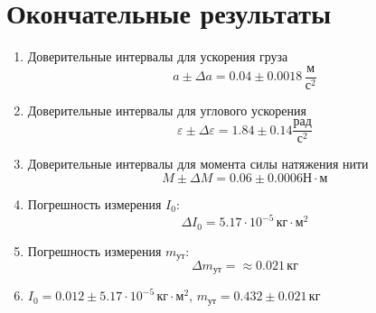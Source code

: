 \section{Окончательные результаты}
\begin{enumerate}
    \item Доверительные интервалы для ускорения груза
        \[ a \pm \Delta a = 0.04 \pm 0.0018 \, \frac{\text{м}}{\text{с}^2} \]
    \item Доверительные интервалы для углового ускорения
        \[
           \varepsilon \pm \Delta \varepsilon = 1.84 \pm 0.14 \frac{\text{рад}}{\text{с}^2} 
        \]
    \item Доверительные интервалы для момента силы натяжения нити
        \[
            M \pm \Delta M = 0.06 \pm 0.0006 \text{Н} \cdot \text{м}
        \]
    \item Погрешность измерения $I_0$:
        \[
            \Delta I_0 = 5.17 \cdot 10^{-5} \, \text{кг} \cdot \text{м}^2
        \]
    \item Погрешность измерения $m_\text{ут}$:
        \[
            \Delta m_\text{ут} = 
            \approx 0.021 \, \text{кг}
        \]
    \item $I_0 = 0.012 \pm 5.17 \cdot 10^{-5}  \, \text{кг} \cdot \text{м}^2 $,
        $m_\text{ут} = 0.432 \pm 0.021 \, \text{кг}$
\end{enumerate}

